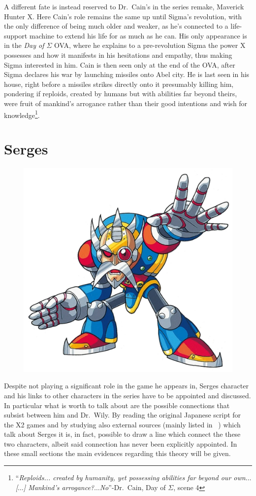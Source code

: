 A different fate is instead reserved to Dr.~Cain's in the series remake, Maverick Hunter X. Here Cain's role remains the same up until Sigma's revolution, with the only difference of being much older and weaker, as he's connected to a life-support machine to extend his life for as much as he can. His only appearance is in the \emph{Day of $\Sigma$} OVA, where he explains to a pre-revolution Sigma the power X possesses and how it manifests in his hesitations and empathy, thus making Sigma interested in him. Cain is then seen only at the end of the OVA, after Sigma declares his war by launching missiles onto Abel city. He is last seen in his house, right before a missiles strikes directly onto it presumably killing him, pondering if reploids, created by humans but with abilities far beyond theirs, were fruit of mankind's arrogance rather than their good intentions and wish for knowledge\footnote{``\textit{Reploids... created by humanity, yet possessing abilities far beyond our own$\dots$ [$\dots$] Mankind's arrogance?$\dots$No}''-Dr.~Cain, Day of $\Sigma$, scene 4}.


\section{Serges} \label{char:Serges}
\begin{figure}[h]
	\centering
	\includegraphics[width=0.4\linewidth]{figures/Characters/Char_Serges.png}
\end{figure}
Despite not playing a significant role in the game he appears in, Serges character and his links to other characters in the series have to be appointed and discussed. In particular what is worth to talk about are the possible connections that subsist between him and Dr.~Wily. By reading the original Japanese script for the X2 games and by studying also external sources (mainly listed in ~\cite{art:Serges_and_Isoc}) which talk about Serges it is, in fact, possible to draw a line which connect the
these two characters, albeit said connection has never been explicitly appointed. In these small sections the main evidences regarding this theory will be given.

